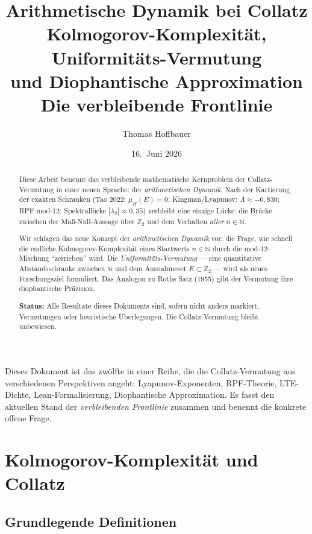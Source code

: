\documentclass[12pt,a4paper]{article}
\title{%
  Arithmetische Dynamik bei Collatz\\[0.3em]
  \large Kolmogorov-Komplexität, Uniformitäts-Vermutung\\
  und Diophantische Approximation\\[0.5em]
  \normalsize Die verbleibende Frontlinie%
}
\author{Thomas Hoffbauer}
\date{16.\ Juni 2026}
\newcommand{\N}{\mathbb{N}}
\newcommand{\Ztwo}{\mathbb{Z}_2}
\begin{document}
\maketitle

\begin{abstract}
Diese Arbeit benennt das verbleibende mathematische Kernproblem der
Collatz-Vermutung in einer neuen Sprache: der \emph{arithmetischen Dynamik}.
Nach der Kartierung der exakten Schranken (Tao 2022: $\mu_H(E)=0$;
Kingman/Lyapunov: $\Lambda \approx -0{,}830$; RPF mod-12: Spektrallücke
$|\lambda_2| \approx 0{,}35$) verbleibt eine einzige Lücke:
die Brücke zwischen der Maß-Null-Aussage über $\Ztwo$ und dem Verhalten
\emph{aller} $n \in \N$.

Wir schlagen das neue Konzept der \emph{arithmetischen Dynamik} vor: die
Frage, wie schnell die endliche Kolmogorov-Komplexität eines Startwerts
$n \in \N$ durch die mod-12-Mischung ``zerrieben'' wird. Die
\emph{Uniformitäts-Vermutung} --- eine quantitative Abstandsschranke
zwischen $\N$ und dem Ausnahmeset $E \subset \Ztwo$ --- wird als neues
Forschungsziel formuliert. Das Analogon zu Roths Satz (1955) gibt
der Vermutung ihre diophantische Präzision.

\textbf{Status:} Alle Resultate dieses Dokuments sind, sofern nicht anders
markiert, Vermutungen oder heuristische Überlegungen. Die Collatz-Vermutung
bleibt unbewiesen.
\end{abstract}

\tableofcontents

\bigskip
\begin{tcolorbox}[warnung, title={Einordnung}]
Dieses Dokument ist das zwölfte in einer Reihe, die die Collatz-Vermutung
aus verschiedenen Perspektiven angeht: Lyapunov-Exponenten, RPF-Theorie,
LTE-Dichte, Lean-Formalisierung, Diophantische Approximation. Es fasst
den aktuellen Stand der \emph{verbleibenden Frontlinie} zusammen und
benennt die konkrete offene Frage.
\end{tcolorbox}

\section{Kolmogorov-Komplexität und Collatz}
\label{sec:kolmogorov}

\subsection{Grundlegende Definitionen}
\end{document}

